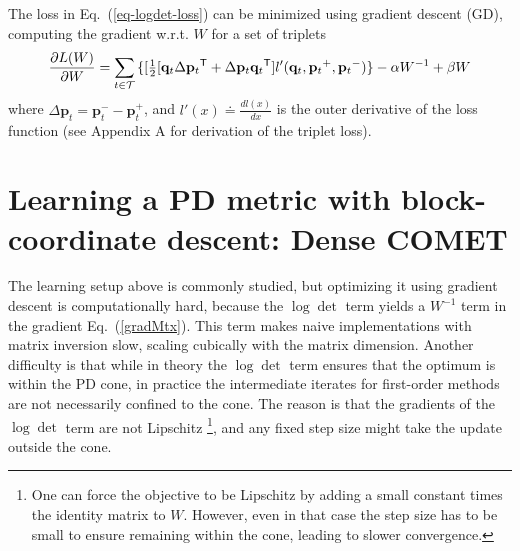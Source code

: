 \documentclass[twoside,11pt]{article}
\newcommand\mat[1]{{#1}}
\renewcommand\vec[1]{\mathbf{#1}}
\newcommand{\T}{{}^\mathsf{T}}
\newcommand{\W}{\mat{W}}
\newcommand{\eqdef}{\doteq}
\newcommand{\ignore}[1]{}
\newcommand{\q}{{\vec{q}}}
\newcommand{\p}{{\vec{p}}}
\newcommand{\trip}{{t}}
\newcommand{\qt}{{\q_{\trip}}}
\newcommand{\pt}{{\p_{\trip}}}
\newcommand{\triplet}{(\qt, \pt^{+}, \pt^{-})}
\renewcommand{\eqref}[1]{Eq.~(\ref{#1})}
\begin{document}
\ignore{
Previous metric learning approaches \citep{OASIS, qianHD, qian}, solved the constrained optimization problem by SGD or stochastic mini-batch gradient steps, while repeatedly projecting back to the convex cone of PD matrices. This projection amounts to solving an eigendecomposition problem and is therefore costly in runtime. An alternative approach is to use a log-barrier term and avoid projecting onto the PD cone \citep{davis2007information,lego}, yielding}


The loss in \eqref{eq-logdet-loss} can be minimized using gradient descent (GD), computing the gradient w.r.t. $\W$ for a set of triplets
\begin{equation}
  \frac{\partial {L (\W)}}{\partial \W} = \sum\limits_{t\in \cal{T}}{\{
  [\tfrac{1}{2}[\q_{t}\Delta\p_{t}\T + \Delta\p_{t}\q_{t}\T]  }
  {l'}\triplet\} - \alpha \W^{-1} + \beta \W
  \label{gradMtx}
\end{equation}
where $\Delta\p_t = \p_t^- - \p_t^+$, and $l'(x) \eqdef \frac{d{l(x)}}{dx}$ is the outer derivative of the loss function (see Appendix A for derivation of the triplet loss). 
\section{Learning a PD metric with block-coordinate descent: Dense COMET}
\label{learing_dense_comet}
The learning setup above is commonly studied, but 
optimizing it using gradient descent is computationally hard, because the $\log \det$ term yields a $\W^{-1}$ term in the gradient \eqref{gradMtx}. This term makes naive implementations with matrix inversion slow, scaling cubically with the matrix dimension. Another difficulty is that while in theory the $\log \det$ term ensures that the optimum is within the PD cone, in practice the intermediate iterates for first-order methods are not necessarily confined to the cone. The reason is that the gradients of the $\log \det$ term are not Lipschitz \footnote{One can force the objective to be Lipschitz by adding a small constant times the identity matrix to $\W$. However, even in that case the step size has to be small to ensure remaining within the cone, leading to slower convergence.}, and any fixed step size might take the update outside the cone. 
\end{document}
